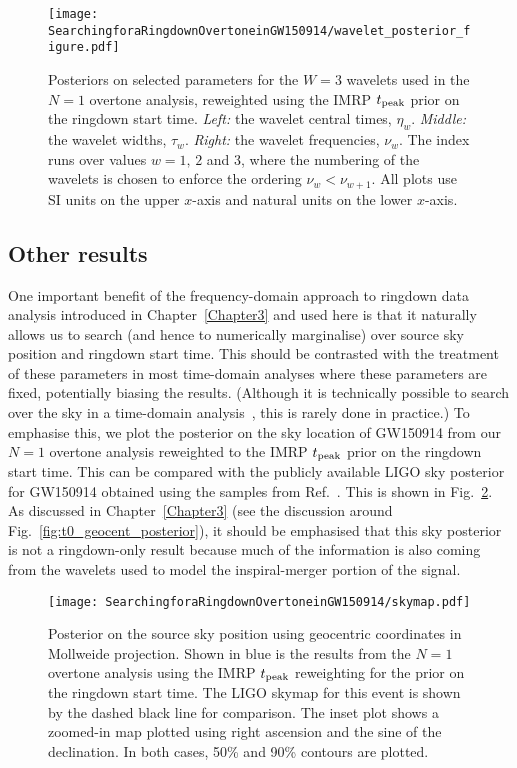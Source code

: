 \begin{figure}[t]
    \centering
    \texttt{[image: SearchingforaRingdownOvertoneinGW150914/wavelet\_posterior\_figure.pdf]}
    \caption[Posteriors on selected wavelet parameters used in the GW150914 overtone analysis]{ 
    Posteriors on selected parameters for the $W=3$ wavelets used in the $N=1$ overtone analysis, reweighted using the IMRP $t_{\rm peak}$ prior on the ringdown start time.
    \emph{Left:} the wavelet central times, $\eta_w$.
    \emph{Middle:} the wavelet widths, $\tau_w$.
    \emph{Right:} the wavelet frequencies, $\nu_w$. 
    The index runs over values $w=1,\,2$ and $3$, where the numbering of the wavelets is chosen to enforce the ordering $\nu_{w}<\nu_{w+1}$.
    All plots use SI units on the upper $x$-axis and natural units on the lower $x$-axis. 
    }
    \label{fig:wavelet}
\end{figure}



\subsection{Other results}\label{subsec:other_results}

One important benefit of the frequency-domain approach to ringdown data analysis introduced in Chapter~\ref{Chapter3} and used here is that it naturally allows us to search (and hence to numerically marginalise) over source sky position and ringdown start time. 
This should be contrasted with the treatment of these parameters in most time-domain analyses where these parameters are fixed, potentially biasing the results. (Although it is technically possible to search over the sky in a time-domain analysis~\cite{Carullo:2019flw, Isi:2021iql}, this is rarely done in practice.)
To emphasise this, we plot the posterior on the sky location of GW150914 from our $N=1$ overtone analysis reweighted to the IMRP $t_{\rm peak}$ prior on the ringdown start time.
This can be compared with the publicly available LIGO sky posterior for GW150914 obtained using the samples from Ref.~\cite{skysamples}.
This is shown in Fig.~\ref{fig:skymap}.
As discussed in Chapter~\ref{Chapter3} (see the discussion around Fig.~\ref{fig:t0_geocent_posterior}), it should be emphasised that this sky posterior is not a ringdown-only result because much of the information is also coming from the wavelets used to model the inspiral-merger portion of the signal.

\begin{figure}[t]
    \centering
    \texttt{[image: SearchingforaRingdownOvertoneinGW150914/skymap.pdf]}
    \caption[Posterior on the GW150914 source sky position]{ 
    Posterior on the source sky position using geocentric coordinates in Mollweide projection.
    Shown in blue is the results from the $N=1$ overtone analysis using the IMRP $t_{\rm peak}$ reweighting for the prior on the ringdown start time.
    The LIGO skymap for this event is shown by the dashed black line for comparison.
    The inset plot shows a zoomed-in map plotted using right ascension and the sine of the declination.
    In both cases, 50\% and 90\% contours are plotted.
    }
    \label{fig:skymap}
\end{figure}


